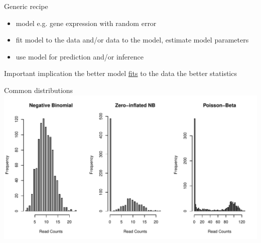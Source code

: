 \documentclass{beamer}\usepackage[]{graphicx}\usepackage[]{color}
\makeatletter
\def\maxwidth{ %
  \ifdim\Gin@nat@width>\linewidth
    \linewidth
  \else
    \Gin@nat@width
  \fi
}
\newenvironment{knitrout}{}{} %
\makeatother
\begin{document}
\begin{frame}
\begin{block}{Generic recipe}
\begin{itemize}
\item model e.g. gene expression with random error
\item fit model to the data and/or data to the model, estimate model parameters
\item use model for prediction and/or inference
\end{itemize}
\end{block}
\vspace{0.5cm}

\begin{block}{Important implication}
the better model \href{http://www.itl.nist.gov/div898/handbook/pmd/section4/pmd44.htm}{fits} to the data the better statistics
\end{block}
\end{frame}

\begin{frame}
\begin{block}{Common distributions}
\begin{knitrout}
\color{fgcolor}
\includegraphics[width=\maxwidth]{figure/dist-1} 

\end{knitrout}
\end{block}
\end{frame}
\end{document}

